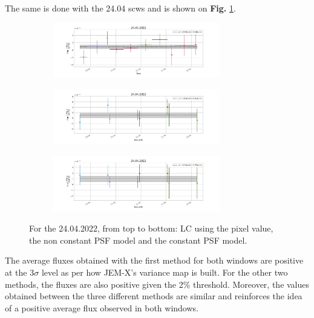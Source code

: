     The same is done with the 24.04 scws and is shown on \textbf{Fig.} \ref{24_lc}.
    
        \begin{figure}[H]
        \centering
        \begin{subfigure}{\textwidth}
            \centering
            \includegraphics[width=0.8\textwidth]{report/Figures/results/lc_2404.png}
        \end{subfigure}%
        \hspace{1em}
        \begin{subfigure}{\textwidth}
            \centering
            \includegraphics[width=0.8\textwidth]{report/Figures/results/lc_2404_notconst.png}
        \end{subfigure}
        \hspace{1em}
        \begin{subfigure}{\textwidth}
            \centering
            \includegraphics[width=0.8\textwidth]{report/Figures/results/lc_2404_psf_const.png}
        \end{subfigure}
        \caption{For the 24.04.2022, from top to bottom: LC using the pixel value, the non constant PSF model and the constant PSF model.}
        \label{24_lc}
        \end{figure}

    The average fluxes obtained with the first method for both windows are positive at the 3$\sigma$ level as per how JEM-X's variance map is built. For the other two methods, the fluxes are also positive given the 2\% threshold. Moreover, the values obtained between the three different methods are similar and reinforces the idea of a positive average flux observed in both windows.


